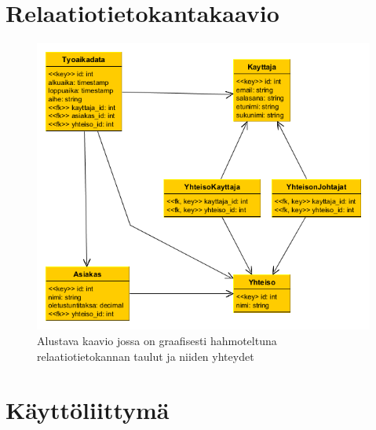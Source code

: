 \documentclass[a4paper, 12pt finnish]{article}
\begin{document}
\newpage
\section{Relaatiotietokantakaavio}
\begin{figure}[h]
    \centering
    \includegraphics[width=1\textwidth]{relaatiokaavio.png}
    \caption{\small Alustava kaavio jossa on graafisesti hahmoteltuna
    relaatiotietokannan taulut ja niiden yhteydet}
\end{figure}

\section{Käyttöliittymä}
\end{document}

